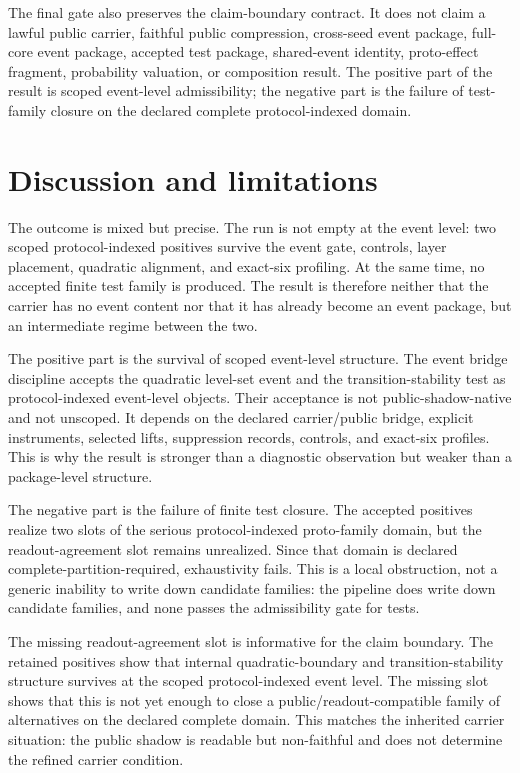\documentclass[11pt]{article}
\theoremstyle{definition}
\begin{document}
The final gate also preserves the claim-boundary contract. It does not claim a lawful public carrier, faithful public compression, cross-seed event package, full-core event package, accepted test package, shared-event identity, proto-effect fragment, probability valuation, or composition result. The positive part of the result is scoped event-level admissibility; the negative part is the failure of test-family closure on the declared complete protocol-indexed domain.
 \section{Discussion and limitations}
\label{sec:discussion}

The outcome is mixed but precise. The run is not empty at the event level: two scoped protocol-indexed positives survive the event gate, controls, layer placement, quadratic alignment, and exact-six profiling. At the same time, no accepted finite test family is produced. The result is therefore neither that the carrier has no event content nor that it has already become an event package, but an intermediate regime between the two.

The positive part is the survival of scoped event-level structure. The event bridge discipline accepts the quadratic level-set event and the transition-stability test as protocol-indexed event-level objects. Their acceptance is not public-shadow-native and not unscoped. It depends on the declared carrier/public bridge, explicit instruments, selected lifts, suppression records, controls, and exact-six profiles. This is why the result is stronger than a diagnostic observation but weaker than a package-level structure.

The negative part is the failure of finite test closure. The accepted positives realize two slots of the serious protocol-indexed proto-family domain, but the readout-agreement slot remains unrealized. Since that domain is declared complete-partition-required, exhaustivity fails. This is a local obstruction, not a generic inability to write down candidate families: the pipeline does write down candidate families, and none passes the admissibility gate for tests.

The missing readout-agreement slot is informative for the claim boundary. The retained positives show that internal quadratic-boundary and transition-stability structure survives at the scoped protocol-indexed event level. The missing slot shows that this is not yet enough to close a public/readout-compatible family of alternatives on the declared complete domain. This matches the inherited carrier situation: the public shadow is readable but non-faithful and does not determine the refined carrier condition.
\end{document}
